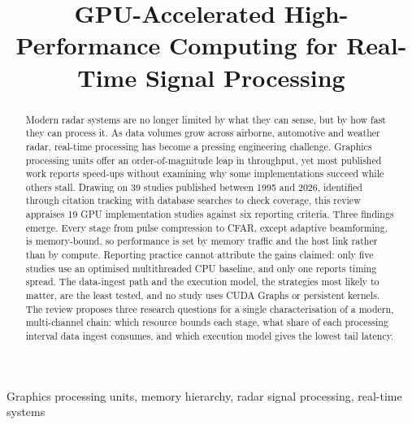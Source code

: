 \documentclass[conference]{IEEEtran}
\begin{document}
\title{GPU-Accelerated High-Performance Computing for Real-Time Signal Processing}

\author{
  }

\maketitle

\begin{abstract}
  Modern radar systems are no longer limited by what they can sense, but by how fast they can process it.
  As data volumes grow across airborne, automotive and weather radar,
  real-time processing has become a pressing engineering challenge.
  Graphics processing units offer an order-of-magnitude leap in throughput,
  yet most published work reports speed-ups without examining why some implementations succeed while others stall.
  Drawing on 39 studies published between 1995 and 2026,
  identified through citation tracking with database searches to check coverage,
  this review appraises 19 GPU implementation studies against six reporting criteria.
  Three findings emerge.
  Every stage from pulse compression to CFAR, except adaptive beamforming, is memory-bound,
  so performance is set by memory traffic and the host link rather than by compute.
  Reporting practice cannot attribute the gains claimed:
  only five studies use an optimised multithreaded CPU baseline, and only one reports timing spread.
  The data-ingest path and the execution model, the strategies most likely to matter, are the least tested,
  and no study uses CUDA Graphs or persistent kernels.
  The review proposes three research questions for a single characterisation of a modern, multi-channel chain:
  which resource bounds each stage, what share of each processing interval data ingest consumes,
  and which execution model gives the lowest tail latency.
\end{abstract}

\begin{IEEEkeywords}
  Graphics processing units, memory hierarchy, radar signal processing, real-time systems
\end{IEEEkeywords}









\clearpage

\clearpage



\clearpage






\end{document}
